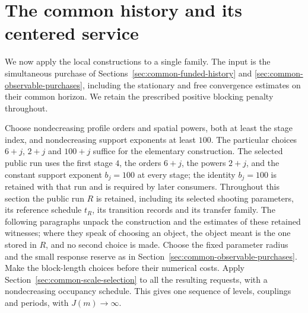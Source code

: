 \section{The common history and its centered service}
\label{sec:selected-centered-service}
We now apply the local constructions to a single family. The input is
the simultaneous purchase of
Sections~\ref{sec:common-funded-history} and
\ref{sec:common-observable-purchases}, including the stationary and
free convergence estimates on their common horizon. We retain the
prescribed positive blocking penalty throughout.

Choose nondecreasing profile orders and spatial powers, both at least the
stage index, and nondecreasing support exponents at least $100$. The
particular choices $6+j$, $2+j$ and $100+j$ suffice for the elementary
construction. The selected public run uses the first stage $4$, the
orders $6+j$, the powers $2+j$, and the constant support exponent
$b_j=100$ at every stage; the identity $b_j=100$ is retained with that
run and is required by later consumers. Throughout this section the
public run $R$ is retained, including its selected shooting parameters,
its reference schedule $t_R$, its transition records and its transfer
family. The following paragraphs unpack the construction and the
estimates of these retained witnesses; where they speak of choosing an
object, the object meant is the one stored in $R$, and no second choice
is made. Choose the fixed parameter radius and the small response reserve
as in Section~\ref{sec:common-observable-purchases}. Make the block-length
choices before their numerical costs. Apply
Section~\ref{sec:common-scale-selection} to all the resulting requests,
with a nondecreasing occupancy schedule. This gives one sequence of
levels, couplings and periods, with $J(m)\to\infty$.

